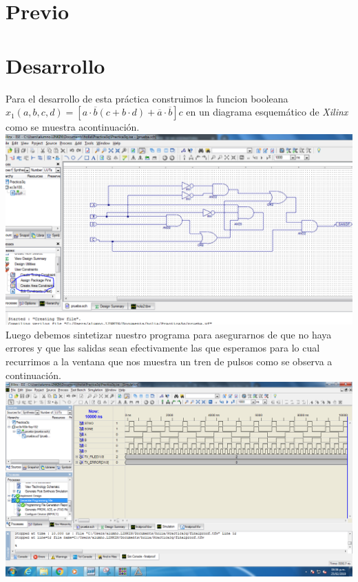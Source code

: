 \documentclass{mylib/reporteConCalif}
\newcommand{\funx}{x_1(a,b,c,d) = [a \cdot \overline{b}(c+b \cdot d) + \overline{a} \cdot \overline{b} ]c}
\begin{document}
\newpage
\section{Previo}

\newpage
\section{Desarrollo}

Para el desarrollo de esta práctica construimos la funcion booleana $\funx$ en un diagrama esquemático de \textit{Xilinx} como se muestra acontinuación.\\

\includegraphics[width=15cm]{img/labdise_practica3/image10}\\

Luego debemos sintetizar nuestro programa para asegurarnos de que no haya errores y que las salidas sean efectivamente las que esperamos para lo cual recurrimos a la ventana que nos muestra un tren de pulsos como se observa a continuación.\\

\includegraphics[width=15cm]{img/labdise_practica3/image4}\\
\end{document}
